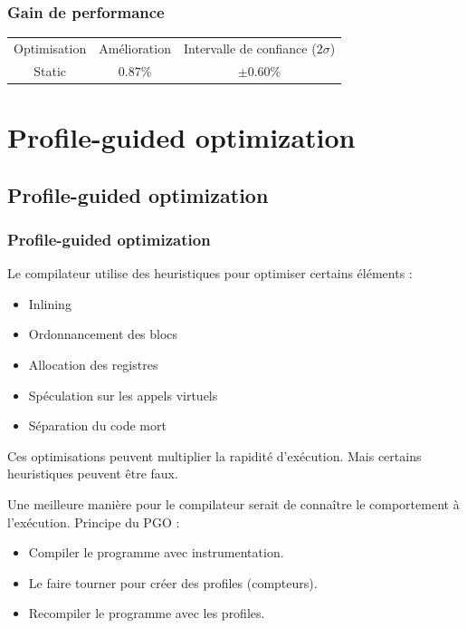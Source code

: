 \documentclass{beamer}
\begin{document}
\begin{frame}[fragile]
    \frametitle{Gain de performance}

    \begin{center}
        \begin{tabular}{ c c c }
            Optimisation & Amélioration & Intervalle de confiance ($2\sigma$) \\
            Static       & $0.87\%$     & $\pm 0.60\%$
        \end{tabular}
    \end{center}
\end{frame}

\section{Profile-guided optimization}

\begin{frame}
    \tableofcontents[currentsection]
\end{frame}

\subsection{Profile-guided optimization}

\begin{frame}
    \frametitle{Profile-guided optimization}

    Le compilateur utilise des heuristiques pour optimiser certains éléments :
    \begin{itemize}
        \item Inlining
        \item Ordonnancement des blocs
        \item Allocation des registres
        \item Spéculation sur les appels virtuels
        \item Séparation du code mort
    \end{itemize}
    Ces optimisations peuvent multiplier la rapidité d'exécution.
    Mais certains heuristiques peuvent être faux.
\end{frame}

\begin{frame}
    Une meilleure manière pour le compilateur serait de connaître le comportement à l'exécution.
    Principe du PGO :
    \begin{itemize}
        \item Compiler le programme avec instrumentation.
        \item Le faire tourner pour créer des profiles (compteurs).
        \item Recompiler le programme avec les profiles.
    \end{itemize}
\end{frame}
\end{document}

